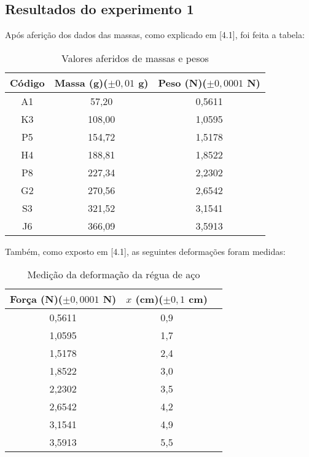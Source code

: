 \documentclass{article}
\begin{document}
\subsection{Resultados do experimento 1}
Após aferição dos dados das massas, como explicado em [4.1], foi feita a tabela:
\begin{table}[!h]
    \centering
    \caption{Valores aferidos de massas e pesos}
    \begin{tabular}{| c | c | c |}
   \hline
     Código & Massa (g)($\pm 0,01$ g) & Peso (N)($\pm 0,0001$ N)       \\
   \hline  
       A1   &   57,20   &   0,5611     \\
   \hline    
       K3   &   108,00  &   1,0595      \\
   \hline    
       P5   &   154,72  &   1,5178      \\
   \hline    
       H4   &   188,81  &   1,8522    \\
   \hline    
       P8   &   227,34  &   2,2302    \\
   \hline    
       G2   &   270,56  &   2,6542   \\
   \hline    
       S3   &   321,52  &   3,1541    \\
   \hline   
       J6   &   366,09  &   3,5913   \\ 
   \hline
\end{tabular} 
    \label{tab:1}
\end{table}

Também, como exposto em [4.1], as seguintes deformações foram medidas:

\begin{table}[!h]
    \centering
    \caption{Medição da deformação da régua de aço}
    \begin{tabular}{| c | c | c |}
    \hline
        Força (N)($\pm 0,0001$ N) & $x$ (cm)($\pm 0,1$ cm)\\
    \hline  
             0,5611   &   0,9    \\
   \hline    
             1,0595   &   1,7    \\
   \hline    
             1,5178    &   2,4    \\
   \hline    
              1,8522     &   3,0    \\
   \hline    
              2,2302   &   3,5    \\
   \hline    
              2,6542  &   4,2    \\
   \hline    
              3,1541  &   4,9    \\
   \hline   
              3,5913  &   5,5    \\ 
   \hline
    \end{tabular}
    \label{tab:2}
\end{table}
\end{document}
